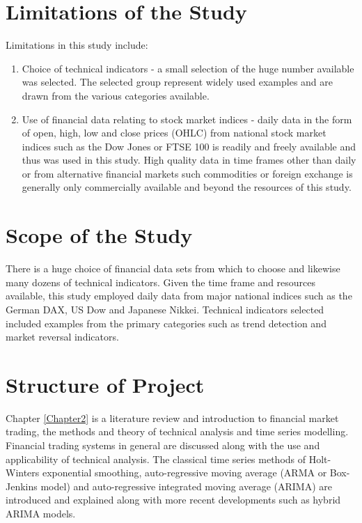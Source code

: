 \section{Limitations of the Study}
Limitations in this study include:
\begin{enumerate}
\item Choice of technical indicators - a small selection of the huge number available was selected. The selected group represent widely used examples and are drawn from the various categories available.
\item Use of financial data relating to stock market indices - daily data in the form of open, high, low and close prices (OHLC) from national stock market indices such as the Dow Jones or FTSE 100 is readily and freely available and thus was used in this study. High quality data in time frames other than daily or from alternative financial markets such commodities or foreign exchange is generally only commercially available and beyond the resources of this study.
\end{enumerate}

\section{Scope of the Study }
There is a huge choice of financial data sets from which to choose and likewise many dozens of technical indicators. Given the time frame and resources available, this study employed daily data from major national indices such as the German DAX, US Dow and Japanese Nikkei. Technical indicators selected included examples from the primary categories such as trend detection and market reversal indicators.

\section{Structure of Project}
Chapter \ref{Chapter2} is a literature review and introduction to financial market trading, the methods and theory of technical analysis and time series modelling. Financial trading systems in general are discussed along with the use and applicability of technical analysis. The classical time series methods of Holt-Winters exponential smoothing, auto-regressive moving average (ARMA or Box-Jenkins model) and auto-regressive integrated moving average (ARIMA) are introduced and explained along with more recent developments such as hybrid ARIMA models.

